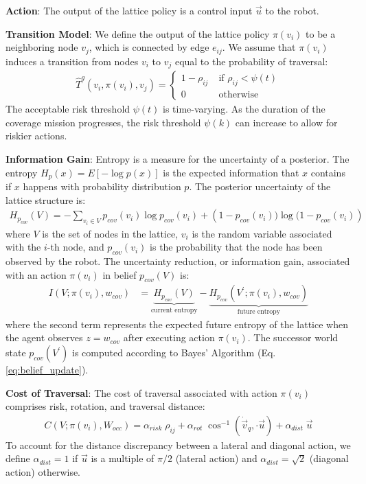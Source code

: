 \documentclass{article}
\newcommand{\ph}[1]{{\textbf{#1}:}} %
\begin{document}
\ph{Action} The output of the lattice policy is a control input $\vec{u}$ to the robot. 

\ph{Transition Model} We define the output of the lattice policy $\pi(v_i)$ to be a neighboring node $v_j$, which is connected by edge $e_{ij}$. We assume that $\pi(v_i)$ induces a transition from nodes $v_i$ to $v_j$ equal to the probability of traversal:
\begin{align}
    \hat{T}^{g} (v_i, \pi(v_i), v_j) = \begin{cases} 
    1-\rho_{ij} \; &\text{if $\rho_{ij} < \psi(t)$}\\
    0 \; &\text{otherwise}
    \end{cases}
\end{align}
The acceptable risk threshold $\psi(t)$ is time-varying. As the duration of the coverage mission progresses, the risk threshold $\psi(k)$ can increase to allow for riskier actions.

\ph{Information Gain} Entropy is a measure for the uncertainty of a posterior. The entropy $H_p(x) = E[-\log p(x)]$ is the expected information that $x$ contains if $x$ happens with probability distribution $p$. The posterior uncertainty of the lattice structure is:
\begin{align}
    H_{p_{cov}}(V) = -\sum_{v_i \in V}p_{cov}(v_i) \log p_{cov}(v_i) + \left(1-p_{cov}(v_i)) \log (1-p_{cov}(v_i)\right)
\end{align}
where $V$ is the set of nodes in the lattice, $v_i$ is the random variable associated with the $i$-th node, and $p_{cov}(v_i)$ is the probability that the node has been observed by the robot. The uncertainty reduction, or information gain, associated with an action $\pi(v_i)$ in belief $p_{cov}(V)$ is:
\begin{align}
    I(V; \pi(v_i), w_{cov}) &= \underbrace{H_{p_{cov}}(V)}_\text{current entropy} - \underbrace{H_{p_{cov}}(V^\prime; \pi(v_i), w_{cov})}_\text{future entropy}
\end{align}
where the second term represents the expected future entropy of the lattice when the agent observes $z = w_{cov}$ after executing action $\pi(v_i)$. The successor world state $p_{cov}(V^\prime)$ is computed according to Bayes' Algorithm (Eq. \ref{eq:belief_update}). 

\ph{Cost of Traversal} The cost of traversal associated with action $\pi(v_i)$ comprises risk, rotation, and traversal distance:
\begin{align}
    C(V; \pi(v_i), W_{occ}) = \alpha_{risk} \; \rho_{ij} + \alpha_{rot} \;  \cos^{-1}(\dot{\vec{v}}_q, \cdot \vec{u}) + \alpha_{dist} \; \vec{u}
    \label{eq:traversal_cost}
\end{align}
To account for the distance discrepancy between a lateral and diagonal action, we define $\alpha_{dist}=1$ if $\vec{u}$ is a multiple of $\pi/2$ (lateral action) and $\alpha_{dist}=\sqrt{2}$ (diagonal action) otherwise.
\end{document}
